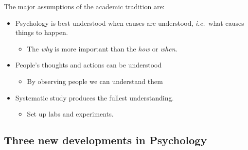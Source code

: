 \documentclass[12pt]{article}
\begin{document}
The major assumptions of the academic tradition are:
\begin{itemize}
    \item Psychology is best understood when causes are understood,
        \textit{i.e.}\ what
        causes things to happen.
        \begin{itemize}
            \item The \textit{why} is more important than the \textit{how} or
                \textit{when}.
        \end{itemize}
    \item People's thoughts and actions can be understood
        \begin{itemize}
            \item By observing people we can understand them
        \end{itemize}
    \item Systematic study produces the fullest understanding.
        \begin{itemize}
            \item Set up labs and experiments.
        \end{itemize}
\end{itemize}

\subsection*{Three new developments in Psychology}
\end{document}
